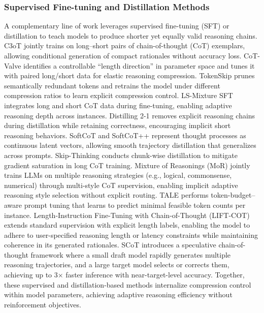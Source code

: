 \documentclass[11pt]{article}
\begin{document}
\subsubsection{Supervised Fine-tuning and Distillation Methods}
\label{sft}
A complementary line of work leverages supervised fine-tuning (SFT) or distillation to
teach models to produce shorter yet equally valid reasoning chains.
C3oT \citep{kang2025c3ot} jointly trains on long–short pairs of chain-of-thought (CoT) exemplars,
allowing conditional generation of compact rationales without accuracy loss.
CoT-Valve \citep{Ma2025CoTValve} identifies a controllable ``length direction'' in parameter space and tunes it with paired long/short data for elastic reasoning compression.
TokenSkip \citep{Xia2025TokenSkip} prunes semantically redundant tokens and retrains the model under different compression ratios to learn explicit compression control.
LS-Mixture SFT \citep{Yu2025LSMixtureSFT} integrates long and short CoT data during fine-tuning,
enabling adaptive reasoning depth across instances.
Distilling 2-1 \citep{Zhang2024DistillingTwoOne} removes explicit reasoning chains during distillation while retaining correctness, encouraging implicit short reasoning behaviors.
SoftCoT \citep{Xu2025SoftCoT} and SoftCoT++ \citep{Xu2025SoftCoTpp} represent thought processes as continuous latent vectors, allowing smooth trajectory distillation that generalizes across prompts.
Skip-Thinking \citep{chen2025skipthinkingchunkwisechainofthoughtdistillation} conducts chunk-wise distillation to mitigate gradient saturation in long CoT training. {Mixture of Reasonings (MoR)} \citep{xiong2025mixturereasoningsteachlarge} jointly trains LLMs on multiple reasoning strategies (e.g., logical, commonsense, numerical) through multi-style CoT supervision, enabling implicit adaptive reasoning style selection without explicit routing.
TALE \citep{Han2025TALE} performs token-budget–aware prompt tuning that learns to predict minimal feasible token counts per instance.
Length-Instruction Fine-Tuning with Chain-of-Thought (LIFT-COT) \citep{electronics14081662}
extends standard supervision with explicit length labels,
enabling the model to adhere to user-specified reasoning length or latency constraints
while maintaining coherence in its generated rationales. SCoT \citep{wang2025efficientreasoningllmsspeculative} introduces a speculative chain-of-thought framework where a small draft model rapidly generates multiple reasoning trajectories, and a large target model selects or corrects them, achieving up to 3× faster inference with near-target-level accuracy. 
Together, these supervised and distillation-based methods internalize compression control within model parameters, achieving adaptive reasoning efficiency without reinforcement objectives.
\end{document}
